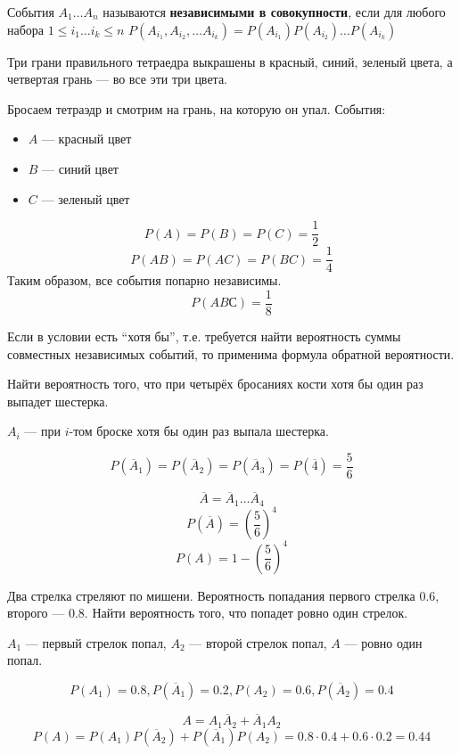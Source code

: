 \documentclass[12pt, a4paper, oneside]{book}
\begin{document}
\begin{definition}
    События \(A_1 \dots A_n\) называются \textbf{независимыми в совокупности}, если для любого набора \(1 \leq i_1 \dots i_k \leq n\) \(P(A_{i_1}, A_{i_2}, \dots A_{i_k}) = P(A_{i_1})P(A_{i_2}) \dots P(A_{i_k})\)
\end{definition}

\begin{example}[Бернштейн]
    Три грани правильного тетраедра выкрашены в красный, синий, зеленый цвета, а четвертая грань --- во все эти три цвета.

    Бросаем тетраэдр и смотрим на грань, на которую он упал. События:
    \begin{itemize}
        \item \(A\) --- красный цвет
        \item \(B\) --- синий цвет
        \item \(C\) --- зеленый цвет
    \end{itemize}

    \[P(A) = P(B) = P(C) = \frac{1}{2}\]
    \[P(AB) = P(AC) = P(BC) = \frac{1}{4}\]
    Таким образом, все события попарно независимы.
    \[P(ABС) = \frac{1}{8}\]
\end{example}

\begin{remark}
    Если в условии есть ``хотя бы'', т.е. требуется найти вероятность суммы совместных независимых событий, то применима формула обратной вероятности.
\end{remark}

\begin{example}
    Найти вероятность того, что при четырёх бросаниях кости хотя бы один раз выпадет шестерка.

    \(A_i\) --- при \(i\)-том броске хотя бы один раз выпала шестерка.

    \[P(\overline A_1) = P(\overline A_2) = P(\overline A_3) = P(\overline 4) = \frac{5}{6}\]

    \[\overline A = \overline A_1 \dots \overline A_4\]
    \[P(\overline A) = \left( \frac{5}{6} \right)^4\]
    \[P(A) = 1 - \left( \frac{5}{6} \right)^4\]
\end{example}

\begin{example}
    Два стрелка стреляют по мишени. Вероятность попадания первого стрелка \(0.6\), второго --- \(0.8\). Найти вероятность того, что попадет ровно один стрелок.

    \(A_1\) --- первый стрелок попал, \(A_2\) --- второй стрелок попал, \(A\) --- ровно один попал.

    \[P(A_1) = 0.8, P(\overline A_1) = 0.2, P(A_2) = 0.6, P(\overline A_2) = 0.4\]

    \[A = A_1 \overline A_2 + \overline A_1 A_2\]
    \[P(A) = P(A_1) P(\overline A_2) + P(\overline A_1) P(A_2) = 0.8 \cdot 0.4 + 0.6 \cdot 0.2 = 0.44\]
\end{example}
\end{document}
